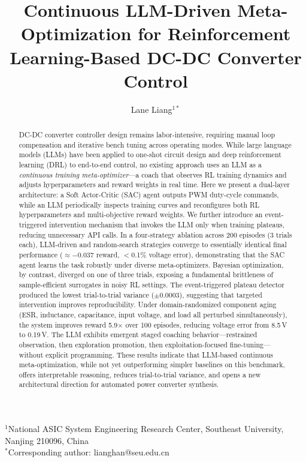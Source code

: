 \documentclass[11pt,a4paper]{article}
\title{Continuous LLM-Driven Meta-Optimization for Reinforcement\\Learning-Based DC-DC Converter Control}
\author{Lane Liang$^{1*}$}
\date{}
\begin{document}
\maketitle

\begin{flushleft}
{\small
$^{1}$National ASIC System Engineering Research Center, Southeast University, Nanjing 210096, China\\
$^{*}$Corresponding author: lianghan@seu.edu.cn
}
\end{flushleft}

\begin{abstract}
DC-DC converter controller design remains labor-intensive, requiring manual
loop compensation and iterative bench tuning across operating modes.
While large language models (LLMs) have been applied to one-shot circuit design
and deep reinforcement learning (DRL) to end-to-end control, no existing approach
uses an LLM as a \textit{continuous training meta-optimizer}---a coach that
observes RL training dynamics and adjusts hyperparameters and reward weights in
real time.
Here we present a dual-layer architecture: a Soft Actor-Critic (SAC) agent outputs
PWM duty-cycle commands, while an LLM periodically inspects training curves and
reconfigures both RL hyperparameters and multi-objective reward weights.
We further introduce an event-triggered intervention mechanism that invokes the LLM
only when training plateaus, reducing unnecessary API calls.
In a four-strategy ablation across 200 episodes (3 trials each), LLM-driven and
random-search strategies converge to essentially identical final performance
($\approx$$-$0.037 reward, $<$0.1\% voltage error), demonstrating that the SAC agent
learns the task robustly under diverse meta-optimizers. Bayesian optimization, by
contrast, diverged on one of three trials, exposing a fundamental brittleness of
sample-efficient surrogates in noisy RL settings. The event-triggered plateau
detector produced the lowest trial-to-trial variance ($\pm$0.0003), suggesting that
targeted intervention improves reproducibility. Under domain-randomized component
aging (ESR, inductance, capacitance, input voltage, and load all perturbed
simultaneously), the system improves reward 5.9$\times$ over 100 episodes, reducing
voltage error from 8.5\,V to 0.19\,V. The LLM exhibits emergent staged coaching
behavior---restrained observation, then exploration promotion, then
exploitation-focused fine-tuning---without explicit programming. These results
indicate that LLM-based continuous meta-optimization, while not yet outperforming
simpler baselines on this benchmark, offers interpretable reasoning, reduces
trial-to-trial variance, and opens a new architectural direction for automated
power converter synthesis.
\end{abstract}
\end{document}
